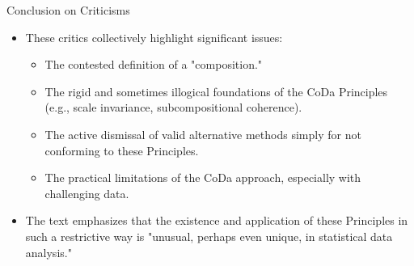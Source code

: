 \begin{frame}{Conclusion on Criticisms}
\scriptsize   %

    \begin{itemize}
        \item These critics collectively highlight significant issues:
        \begin{itemize}
            \item The contested definition of a "composition."
            \item The rigid and sometimes illogical foundations of the CoDa Principles (e.g., scale invariance, subcompositional coherence).
            \item The active dismissal of valid alternative methods simply for not conforming to these Principles.
            \item The practical limitations of the CoDa approach, especially with challenging data.
        \end{itemize}
        \item The text emphasizes that the existence and application of these Principles in such a restrictive way is "unusual, perhaps even unique, in statistical data analysis."
    \end{itemize}
\end{frame}



